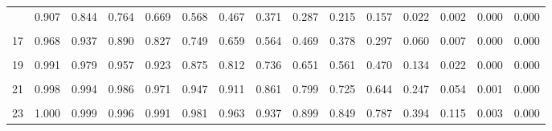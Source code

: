 \documentclass[
]{article}
\begin{document}
\begin{table}[!h]
{\begin{tabular}[t]{ccccccccccccccc}
\addlinespace
15 & 0.907 & 0.844 & 0.764 & 0.669 & 0.568 & 0.467 & 0.371 & 0.287 & 0.215 & 0.157 & 0.022 & 0.002 & 0.000 & 0.000\\
\cellcolor{gray!10}{16} & \cellcolor{gray!10}{0.944} & \cellcolor{gray!10}{0.899} & \cellcolor{gray!10}{0.835} & \cellcolor{gray!10}{0.756} & \cellcolor{gray!10}{0.664} & \cellcolor{gray!10}{0.566} & \cellcolor{gray!10}{0.468} & \cellcolor{gray!10}{0.375} & \cellcolor{gray!10}{0.292} & \cellcolor{gray!10}{0.221} & \cellcolor{gray!10}{0.038} & \cellcolor{gray!10}{0.004} & \cellcolor{gray!10}{0.000} & \cellcolor{gray!10}{0.000}\\
17 & 0.968 & 0.937 & 0.890 & 0.827 & 0.749 & 0.659 & 0.564 & 0.469 & 0.378 & 0.297 & 0.060 & 0.007 & 0.000 & 0.000\\
\cellcolor{gray!10}{18} & \cellcolor{gray!10}{0.982} & \cellcolor{gray!10}{0.963} & \cellcolor{gray!10}{0.930} & \cellcolor{gray!10}{0.883} & \cellcolor{gray!10}{0.819} & \cellcolor{gray!10}{0.742} & \cellcolor{gray!10}{0.655} & \cellcolor{gray!10}{0.562} & \cellcolor{gray!10}{0.469} & \cellcolor{gray!10}{0.381} & \cellcolor{gray!10}{0.092} & \cellcolor{gray!10}{0.013} & \cellcolor{gray!10}{0.000} & \cellcolor{gray!10}{0.000}\\
19 & 0.991 & 0.979 & 0.957 & 0.923 & 0.875 & 0.812 & 0.736 & 0.651 & 0.561 & 0.470 & 0.134 & 0.022 & 0.000 & 0.000\\
\addlinespace
\cellcolor{gray!10}{20} & \cellcolor{gray!10}{0.995} & \cellcolor{gray!10}{0.988} & \cellcolor{gray!10}{0.975} & \cellcolor{gray!10}{0.952} & \cellcolor{gray!10}{0.917} & \cellcolor{gray!10}{0.868} & \cellcolor{gray!10}{0.805} & \cellcolor{gray!10}{0.731} & \cellcolor{gray!10}{0.647} & \cellcolor{gray!10}{0.559} & \cellcolor{gray!10}{0.185} & \cellcolor{gray!10}{0.035} & \cellcolor{gray!10}{0.000} & \cellcolor{gray!10}{0.000}\\
21 & 0.998 & 0.994 & 0.986 & 0.971 & 0.947 & 0.911 & 0.861 & 0.799 & 0.725 & 0.644 & 0.247 & 0.054 & 0.001 & 0.000\\
\cellcolor{gray!10}{22} & \cellcolor{gray!10}{0.999} & \cellcolor{gray!10}{0.997} & \cellcolor{gray!10}{0.992} & \cellcolor{gray!10}{0.983} & \cellcolor{gray!10}{0.967} & \cellcolor{gray!10}{0.942} & \cellcolor{gray!10}{0.905} & \cellcolor{gray!10}{0.855} & \cellcolor{gray!10}{0.793} & \cellcolor{gray!10}{0.721} & \cellcolor{gray!10}{0.318} & \cellcolor{gray!10}{0.081} & \cellcolor{gray!10}{0.001} & \cellcolor{gray!10}{0.000}\\
23 & 1.000 & 0.999 & 0.996 & 0.991 & 0.981 & 0.963 & 0.937 & 0.899 & 0.849 & 0.787 & 0.394 & 0.115 & 0.003 & 0.000\\

\end{tabular}}
\end{table}
\end{document}
